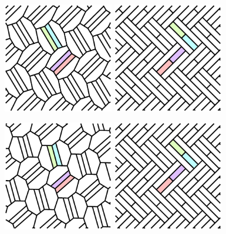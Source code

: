 \documentclass{beamer}
\begin{document}
\begin{frame}
  \begin{center}
    \includegraphics[width=1.9in]{c03}
    \includegraphics[width=1.9in]{c12}
  \end{center}
\end{frame}

\begin{frame}
  \begin{center}
    \includegraphics[width=1.9in]{c04}
    \includegraphics[width=1.9in]{c12}
  \end{center}
\end{frame}
\end{document}
